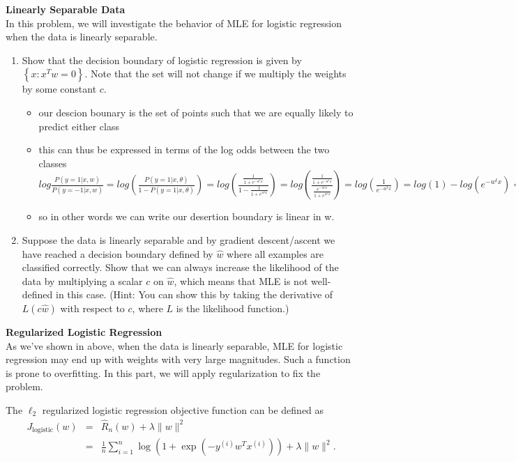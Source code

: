 \documentclass{article}
\newcommand{\nyuparagraph}[1]{\vspace{0.3cm}\textcolor{nyupurple}{\bf \large #1}\\}
\theoremstyle{plain}
\theoremstyle{definition}
\begin{document}
\newpage
\nyuparagraph{Linearly Separable Data}
\label{sec:linear}
In this problem, we will investigate the behavior of MLE for logistic regression when the data is linearly separable.

\begin{enumerate}
  \setcounter{enumi}{\value{saveenum}}
\item Show that the decision boundary of logistic regression is given by $\left\{x\colon x^Tw=0\right\}$.
Note that the set will not change if we multiply the weights by some constant $c$.
\begin{itemize}
    \color{blue}
    \item our descion bounary is the set of points such that we are equally likely to predict either class 
    \item this can thus be expressed in terms of the log odds between the two classes $log\frac{P(y=1|x,w)}{P(y=-1|x,w)}=log(\frac{P(y=1|x,\theta)}{1-P(y=1|x,\theta)})=log(\frac{\frac{1}{1+e^{-w^tx}}} {1-\frac{1}{1+e^{w^tx}}})=log(\frac{\frac{1}{1+e^{-w^tx}}} {\frac{e^{-w^tx}}{1+e^{w^tx}}})=log(\frac{1}{e^{-w^tx}})=log(1)-log(e^{-w^tx})=0-(-w^txlog(e))=w^tx$
    \item so in other words we can write our desertion boundary is linear in w. 
\end{itemize}

\item Suppose the data is linearly separable and by gradient descent/ascent we have reached a decision boundary defined by $\hat{w}$ where all examples are classified correctly. 
Show that we can always increase the likelihood of the data by multiplying a scalar $c$ on $\hat{w}$,
which means that MLE is not well-defined in this case.
{(Hint: You can show this by taking the derivative of $L(c\hat{w})$ with respect to $c$, where $L$ is the likelihood function.)}

\setcounter{saveenum}{\value{enumi}}
\end{enumerate}

\nyuparagraph{\label{subsec:Regularized-Logistic-Regression}Regularized Logistic
Regression}
As we've shown in above, when the data is linearly separable,
MLE for logistic regression may end up with weights with very large magnitudes. Such a function is prone to overfitting.
In this part, we will apply regularization to fix the problem.

The $\ell_2$ regularized
logistic regression objective function can be defined as
\begin{eqnarray*}
J_{\text{logistic}}(w) & = & \hat{R}_{n}(w)+\lambda\|w\|^{2}\\
 & = & \frac{1}{n}\sum_{i=1}^{n}\log\left(1+\exp\left(-y^{(i)}w^{T}x^{(i)}\right)\right)+\lambda\|w\|^{2}.
\end{eqnarray*}
 
\end{document}
